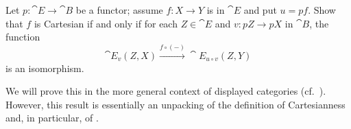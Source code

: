 \begin{exercise}
Let \(p : \cat{E} \to \cat{B}\) be a functor; assume \(f : X \to Y\) is in \(\cat E\) and put \(u = p f\).
Show that \(f\) is Cartesian if and only if for each \(Z \in \cat{E}\) and \(v : p Z \to pX\) in \(\cat{B}\), the function
\begin{equation*}
\cat{E}_v(Z, X) \xrightarrow{f \circ (-)} \cat{E}_{u \circ v}(Z, Y)
\end{equation*}
is an isomorphism.
\end{exercise}

\begin{remark}
We will prove this in the more general context of displayed categories (cf.~\cite{lmcs:5252}).
However, this result is essentially an unpacking of the definition of Cartesianness and, in particular, of \cite[Definition~5.1]{lmcs:5252}.
\end{remark}

